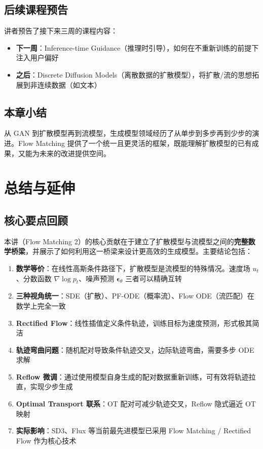 \documentclass[a4paper]{article}
\begin{document}
\subsection{后续课程预告}

讲者预告了接下来三周的课程内容：
\begin{itemize}
    \item \textbf{下一周}：Inference-time Guidance（推理时引导），如何在不重新训练的前提下注入用户偏好
    \item \textbf{之后}：Discrete Diffusion Models（离散数据的扩散模型），将扩散/流的思想拓展到非连续数据（如文本）
\end{itemize}

\subsection{本章小结}

从 GAN 到扩散模型再到流模型，生成模型领域经历了从单步到多步再到少步的演进。Flow Matching 提供了一个统一且更灵活的框架，既能理解扩散模型的已有成果，又能为未来的改进提供空间。

\section{总结与延伸}

\subsection{核心要点回顾}

本讲（Flow Matching 2）的核心贡献在于建立了扩散模型与流模型之间的\textbf{完整数学桥梁}，并展示了如何利用这一桥梁来设计更高效的生成模型。主要结论包括：

\begin{enumerate}
    \item \textbf{数学等价}：在线性高斯条件路径下，扩散模型是流模型的特殊情况。速度场 $u_t$、分数函数 $\nabla \log p_t$、噪声预测 $\boldsymbol{\epsilon}_\theta$ 三者可以精确互转

    \item \textbf{三种视角统一}：SDE（扩散）、PF-ODE（概率流）、Flow ODE（流匹配）在数学上完全一致

    \item \textbf{Rectified Flow}：线性插值定义条件轨迹，训练目标为速度预测，形式极其简洁

    \item \textbf{轨迹弯曲问题}：随机配对导致条件轨迹交叉，边际轨迹弯曲，需要多步 ODE 求解

    \item \textbf{Reflow 微调}：通过使用模型自身生成的配对数据重新训练，可有效将轨迹拉直，实现少步生成

    \item \textbf{Optimal Transport 联系}：OT 配对可减少轨迹交叉，Reflow 隐式逼近 OT 映射

    \item \textbf{实际影响}：SD3、Flux 等当前最先进模型已采用 Flow Matching / Rectified Flow 作为核心技术
\end{enumerate}
\end{document}
